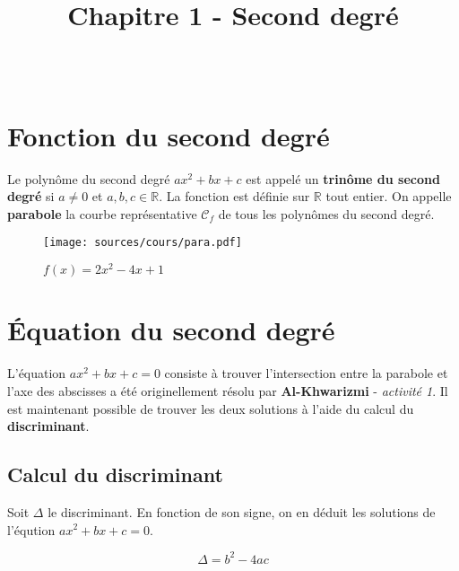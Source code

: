 \documentclass[paper=a4, fontsize=9pt]{scrartcl} %
\title{	
  \vspace{-10ex}
  \horrule{0.5pt} \\[0.4cm] %
  \huge Chapitre 1 - Second degré\\ %
  \horrule{2pt} \\[0.5cm] %
}
\author{}
\date{\vspace{-10ex}} %
\begin{document}

\newtheorem{Definition}{Définition}
\newtheorem{Theorem}{Théorème}
\newtheorem{Proposition}{Propriété}

\renewcommand{\labelitemi}{$\bullet$}
\renewcommand{\labelitemii}{$\circ$}

\maketitle %
\setlength{\columnseprule}{1pt}
\begin{multicols}{2}

  \section{Fonction du second degré}

  Le polynôme du second degré $a x^2 + b x + c$ est appelé un \textbf{trinôme du second degré} si $a \neq 0$ et $a, b, c \in \mathbb{R}$. La fonction est définie sur $\mathbb{R}$ tout entier. On appelle \textbf{parabole} la courbe représentative $\mathcal{C}_f$ de tous les polynômes du second degré.

  \begin{figure}[H]
    \centering
    \texttt{[image: sources/cours/para.pdf]}
    \caption{$f(x) = 2x^2 -4x + 1$}
  \end{figure}

  \section{Équation du second degré}

  L'équation $a x^2 + b x + c = 0$ consiste à trouver l'intersection entre la parabole et l'axe des abscisses a été originellement résolu par \textbf{Al-Khwarizmi} - \textit{activité 1}. Il est maintenant possible de trouver les deux solutions à l'aide du calcul du \textbf{discriminant}.

  \subsection{Calcul du discriminant}

  Soit $\Delta$ le discriminant. En fonction de son signe, on en déduit les solutions de l'éqution $a x^2 + b x + c = 0$.

  $$\Delta = b^2 - 4ac$$
\end{multicols}
\end{document}
